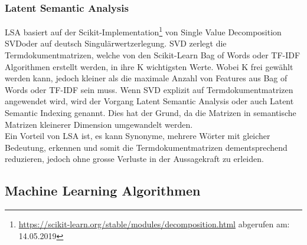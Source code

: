 \subsubsection{Latent Semantic Analysis}
LSA basiert auf der Scikit-Implementation\footnote{\url{https://scikit-learn.org/stable/modules/decomposition.html} abgerufen am: 14.05.2019} von \glqq Single Value Decomposition SVD\grqq{}oder auf deutsch \glqq Singulärwertzerlegung\grqq{}.
SVD zerlegt die Termdokumentmatrizen, welche von den Scikit-Learn Bag of Words oder TF-IDF Algorithmen erstellt werden, in ihre K wichtigsten Werte. Wobei K frei gewählt werden kann, jedoch kleiner als die maximale Anzahl von Features aus Bag of Words oder TF-IDF sein muss.
Wenn SVD explizit auf Termdokumentmatrizen angewendet wird, wird der Vorgang \glqq Latent Semantic Analysis\grqq{} oder auch \glqq Latent Semantic Indexing\grqq{} genannt.
Dies hat der Grund, da die Matrizen in semantische Matrizen kleinerer Dimension umgewandelt werden.\\
Ein Vorteil von LSA ist, es kann Synonyme, mehrere Wörter mit gleicher Bedeutung, erkennen und somit die Termdokumentmatrizen dementsprechend reduzieren, jedoch ohne grosse Verluste in der Aussagekraft zu erleiden.
\subsection{Machine Learning Algorithmen}
